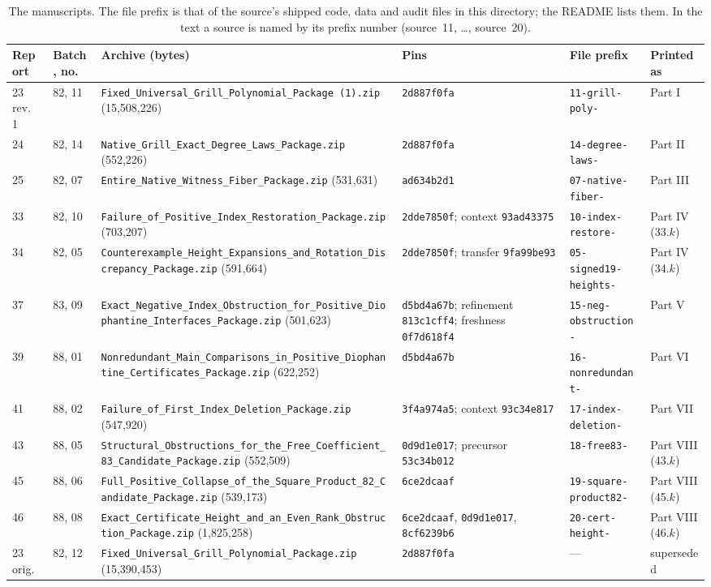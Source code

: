\documentclass[11pt,letterpaper]{article}
\theoremstyle{definition}\newtheorem{definition}[theorem]{Definition}
\theoremstyle{remark}\newtheorem{remark}[theorem]{Remark}
\newcommand{\rw}[1]{\nolinkurl{#1}}%
\begin{document}
\begin{table}[ht]
\centering\footnotesize
\begin{tabular}{@{}p{}p{}p{}p{}p{}p{}@{}}
\toprule
Report & Batch, no. & Archive (bytes) & Pins & File prefix & Printed as\\\midrule
23 rev.~1 & 82, 11 & \rw{Fixed_Universal_Grill_Polynomial_Package (1).zip} (15,508,226) & \texttt{2d887f0fa} & \texttt{11-grill-poly-} & Part I\\
24 & 82, 14 & \rw{Native_Grill_Exact_Degree_Laws_Package.zip} (552,226) & \texttt{2d887f0fa} & \texttt{14-degree-laws-} & Part II\\
25 & 82, 07 & \rw{Entire_Native_Witness_Fiber_Package.zip} (531,631) & \texttt{ad634b2d1} & \texttt{07-native-fiber-} & Part III\\
33 & 82, 10 & \rw{Failure_of_Positive_Index_Restoration_Package.zip} (703,207) & \texttt{2dde7850f}; context \texttt{93ad43375} & \texttt{10-index-restore-} & Part IV (33.$k$)\\
34 & 82, 05 & \rw{Counterexample_Height_Expansions_and_Rotation_Discrepancy_Package.zip} (591,664) & \texttt{2dde7850f}; transfer \texttt{9fa99be93} & \texttt{05-signed19-heights-} & Part IV (34.$k$)\\
37 & 83, 09 & \rw{Exact_Negative_Index_Obstruction_for_Positive_Diophantine_Interfaces_Package.zip} (501,623) & \texttt{d5bd4a67b}; refinement \texttt{813c1cff4}; freshness \texttt{0f7d618f4} & \texttt{15-neg-obstruction-} & Part V\\
39 & 88, 01 & \rw{Nonredundant_Main_Comparisons_in_Positive_Diophantine_Certificates_Package.zip} (622,252) & \texttt{d5bd4a67b} & \texttt{16-nonredundant-} & Part VI\\
41 & 88, 02 & \rw{Failure_of_First_Index_Deletion_Package.zip} (547,920) & \texttt{3f4a974a5}; context \texttt{93c34e817} & \texttt{17-index-deletion-} & Part VII\\
43 & 88, 05 & \rw{Structural_Obstructions_for_the_Free_Coefficient_83_Candidate_Package.zip} (552,509) & \texttt{0d9d1e017}; precursor \texttt{53c34b012} & \texttt{18-free83-} & Part VIII (43.$k$)\\
45 & 88, 06 & \rw{Full_Positive_Collapse_of_the_Square_Product_82_Candidate_Package.zip} (539,173) & \texttt{6ce2dcaaf} & \texttt{19-square-product82-} & Part VIII (45.$k$)\\
46 & 88, 08 & \rw{Exact_Certificate_Height_and_an_Even_Rank_Obstruction_Package.zip} (1,825,258) & \texttt{6ce2dcaaf}, \texttt{0d9d1e017}, \texttt{8cf6239b6} & \texttt{20-cert-height-} & Part VIII (46.$k$)\\
23 orig. & 82, 12 & \rw{Fixed_Universal_Grill_Polynomial_Package.zip} (15,390,453) & \texttt{2d887f0fa} & --- & superseded\\\bottomrule
\end{tabular}
\caption{The manuscripts. The file prefix is that of the source's shipped code, data and audit files in this directory; the README lists them. In the text a source is named by its prefix number (source~11, \ldots, source~20).}\label{fup:fm:tab:sources}
\end{table}
\end{document}
